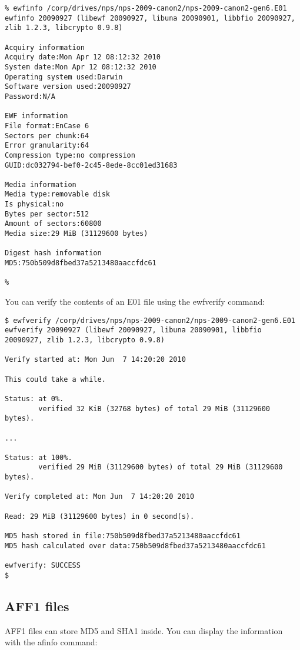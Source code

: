 \begin{Verbatim}
% ewfinfo /corp/drives/nps/nps-2009-canon2/nps-2009-canon2-gen6.E01 
ewfinfo 20090927 (libewf 20090927, libuna 20090901, libbfio 20090927, zlib 1.2.3, libcrypto 0.9.8)

Acquiry information
Acquiry date:Mon Apr 12 08:12:32 2010
System date:Mon Apr 12 08:12:32 2010
Operating system used:Darwin
Software version used:20090927
Password:N/A

EWF information
File format:EnCase 6
Sectors per chunk:64
Error granularity:64
Compression type:no compression
GUID:dc032794-bef0-2c45-8ede-8cc01ed31683

Media information
Media type:removable disk
Is physical:no
Bytes per sector:512
Amount of sectors:60800
Media size:29 MiB (31129600 bytes)

Digest hash information
MD5:750b509d8fbed37a5213480aaccfdc61

% 
\end{Verbatim}


You can verify the contents of an E01 file using the ewfverify
command:

\begin{Verbatim}
$ ewfverify /corp/drives/nps/nps-2009-canon2/nps-2009-canon2-gen6.E01 
ewfverify 20090927 (libewf 20090927, libuna 20090901, libbfio
20090927, zlib 1.2.3, libcrypto 0.9.8)

Verify started at: Mon Jun  7 14:20:20 2010

This could take a while.

Status: at 0%.
        verified 32 KiB (32768 bytes) of total 29 MiB (31129600 bytes).

...

Status: at 100%.
        verified 29 MiB (31129600 bytes) of total 29 MiB (31129600 bytes).

Verify completed at: Mon Jun  7 14:20:20 2010

Read: 29 MiB (31129600 bytes) in 0 second(s).

MD5 hash stored in file:750b509d8fbed37a5213480aaccfdc61
MD5 hash calculated over data:750b509d8fbed37a5213480aaccfdc61

ewfverify: SUCCESS
$ 
\end{Verbatim}


\subsection{AFF1 files}
AFF1 files can store MD5 and SHA1 inside. You can display the
information with the afinfo command:

